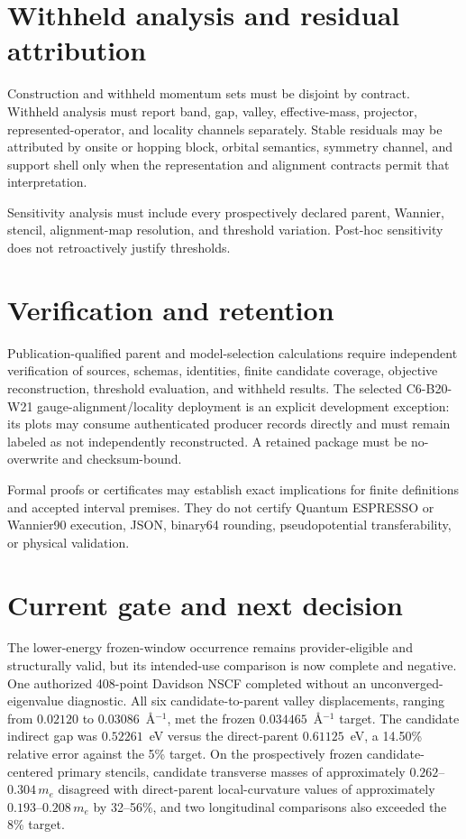 \documentclass[11pt]{article}
\begin{document}
\section{Withheld analysis and residual attribution}

Construction and withheld momentum sets must be disjoint by contract.  Withheld
analysis must report band, gap, valley, effective-mass, projector, represented-operator,
and locality channels separately.  Stable residuals may be attributed by onsite or
hopping block, orbital semantics, symmetry channel, and support shell only when the
representation and alignment contracts permit that interpretation.

Sensitivity analysis must include every prospectively declared parent, Wannier,
stencil, alignment-map resolution, and threshold variation.  Post-hoc sensitivity does
not retroactively justify thresholds.

\section{Verification and retention}

Publication-qualified parent and model-selection calculations require independent
verification of sources, schemas, identities, finite candidate coverage, objective
reconstruction, threshold evaluation, and withheld results.  The selected
C6-B20-W21 gauge-alignment/locality deployment is an explicit development exception:
its plots may consume authenticated producer records directly and must remain labeled
as not independently reconstructed.  A retained package must be no-overwrite and
checksum-bound.

Formal proofs or certificates may establish exact implications for finite definitions
and accepted interval premises.  They do not certify Quantum ESPRESSO or Wannier90
execution, JSON, binary64 rounding, pseudopotential transferability, or physical
validation.

\section{Current gate and next decision}

The lower-energy frozen-window occurrence remains provider-eligible and structurally
valid, but its intended-use comparison is now complete and negative.  One authorized
408-point Davidson NSCF completed without an unconverged-eigenvalue diagnostic.  All six
candidate-to-parent valley displacements, ranging from $0.02120$ to
$0.03086$~\AA$^{-1}$, met the frozen $0.034465$~\AA$^{-1}$ target.  The candidate
indirect gap was $0.52261$~eV versus the direct-parent $0.61125$~eV, a 14.50\% relative
error against the 5\% target.  On the prospectively frozen candidate-centered primary
stencils, candidate transverse masses of approximately $0.262$--$0.304\,m_e$ disagreed
with direct-parent local-curvature values of approximately $0.193$--$0.208\,m_e$ by
32--56\%, and two longitudinal comparisons also exceeded the 8\% target.
\end{document}
